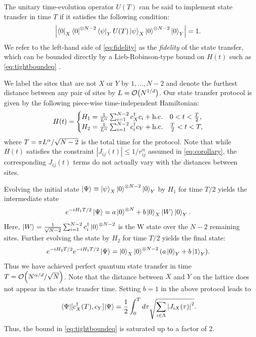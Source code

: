 The unitary time-evolution operator $U(T)$ can be said to implement state transfer in time $T$ if it satisfies the following condition:
\begin{align}
	\label{eq:fidelity}
	\left|\left \langle 0 \right |_{X}\left \langle 0 \right |^{\otimes N-2}\left \langle \psi \right |_{Y} U(T)\left | \psi \right\rangle_{X}\left | 0 \right\rangle^{\otimes N-2}\left | 0 \right\rangle_{Y}\right| = 1.
 \end{align}
We refer to the left-hand side of \cref{eq:fidelity} as the \emph{fidelity} of the state transfer, which can be bounded directly by a Lieb-Robinson-type bound on $H(t)$ such as \cref{eq:tightboundeq} \cite{Epstein17}.

We label the sites that are not $X$ or $Y$ by $1,\dots,N-2$ and denote the furthest distance between any pair of sites by $L=\O{N^{1/d}}$. Our state transfer protocol is given by the following piece-wise time-independent Hamiltonian:
\begin{align}
\label{eq:protocol}
H(t)= \begin{cases}
	H_{1}=\frac{1}{L^{\alpha}} \sum_{i=1}^{N-2} c_{X}^{\dagger}c_{i}+\text{h.c.} & 0<t<\frac{T}{2},\\
	H_{2}=\frac{1}{L^{\alpha}} \sum_{i=1}^{N-2} c_{i}^{\dagger}c_{Y}+\text{h.c.} & \frac{T}{2}<t<T,
\end{cases}
\end{align}
where $T=\pi L^{\alpha}/\sqrt{N-2}$ is the total time for the protocol. Note that while $H(t)$ satisfies the constraint $|J_{ij}(t)|\le 1/r_{ij}^{\alpha}$ assumed in \cref{eq:corollary}, the corresponding $J_{ij}(t)$ terms do not actually vary with the distances between sites.

Evolving the initial state
$\left | \Psi \right\rangle \equiv \left | \psi \right\rangle_{X}\left | 0 \right\rangle^{\otimes N-2}\left | 0 \right\rangle_{Y}$  by $H_1$ for time $T/2$ yields the intermediate state
\begin{equation}
	e^{-i H_1 T/2}\left | \Psi \right\rangle= a \left | 0 \right\rangle^{\otimes N} + b\left | 0 \right\rangle_{X}\left | W \right\rangle\left | 0 \right\rangle_{Y}.
\end{equation}
Here, $\left | W \right\rangle= \frac{1}{\sqrt{N-2}}\sum_{i=1}^{N-2} c_{i}^{\dagger}\left | 0 \right\rangle^{\otimes N-2}$ is the W state over the $N-2$ remaining sites. Further evolving the state by $H_2$ for time $T/2$ yields the final state:
\begin{equation}
	e^{-i H_2 T/2}e^{-i H_1 T/2}\left | \Psi \right\rangle= \left | 0 \right\rangle_{X}\left | 0 \right\rangle^{\otimes N-2}(a \left | 0 \right\rangle_{Y}+ b\left | 1 \right\rangle_{Y}).
\end{equation}
Thus we have achieved perfect quantum state transfer in time $T = \O{N^{\al/d}/\sqrt{N}}$.
Note that the distance between $X$ and $Y$ on the lattice does not appear in the state transfer time.
    Setting $b=1$ in the above protocol leads to
\begin{equation}
    \expval{[c^\dagger_{X}(T),c_{Y}]}{\Psi} = \frac{1}{2}\int_{0}^{T}d\tau\sqrt{\sum_{i\in\Lambda}\left|J_{iX}(\tau)\right|^{2}}.
\end{equation}
Thus, the bound in \cref{eq:tightboundeq} is saturated up to a factor of 2.

